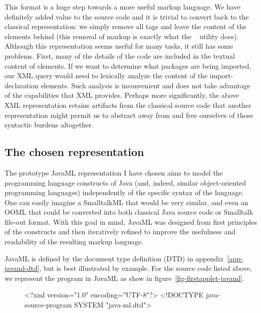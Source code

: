 \documentclass{article}
\begin{document}
\begin{multicols}{2}
This format is a huge step towards a more useful markup language.  We
have definitely added value to the source code and it is trivial to
convert back to the classical representation: we simply remove all tags
and leave the content of the elements behind (this removal of markup is
exactly what the ~\cite{perlSGML} utility does).
Although this representation seems useful for many tasks, it still has
some problems.  First, many of the details of the code are included in
the textual content of elements.  If we want to determine what packages
are being imported, our XML query would need to lexically analyze the
content of the import-declaration elements.  Such analysis is
inconvenient and does not take advantage of the capabilities that XML
provides.  Perhaps more significantly, the above XML representation
retains artifacts from the classical source code that another
representation might permit us to abstract away from and free ourselves
of those syntactic burdens altogether.

\subsection{The chosen representation}

The prototype JavaML representation I have chosen aims to model the
programming language constructs of Java (and, indeed, similar
object-oriented programming languages) independently of the specific
syntax of the language.  One can easily imagine a SmalltalkML that would
be very similar, and even an OOML that could be converted into both
classical Java source code or Smalltalk file-out format.  With this goal
in mind, JavaML was designed from first principles of the constructs and
then iteratively refined to improve the usefulness and readability of
the resulting markup language.

JavaML is defined by the document type definition (DTD) in
appendix~\ref{app-javaml-dtd}, but is best illustrated by example.  For the
 source code listed above, we represent the
program in JavaML as show in figure~\ref{fig-firstapplet-javaml}.

\begin{figure}[p]
\begin{listing}{1}
<?xml version="1.0" encoding="UTF-8"?>
<!DOCTYPE java-source-program SYSTEM "java-ml.dtd">


\end{listing}
\end{figure}
\end{multicols}
\end{document}
